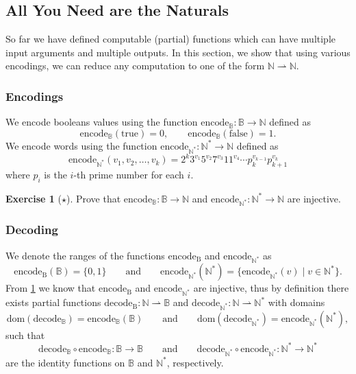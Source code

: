 \documentclass[11pt,a4paper,reqno]{amsart}
\theoremstyle{plain}
\theoremstyle{definition}
\theoremstyle{definition}
\newtheorem{exercise}[theorem]{Exercise}
\newcommand\exerciseLevelEasy{$\star$}
\begin{document}
\subsection{All You Need are the Naturals}\label{sec:only-natural}

So far we have defined computable (partial) functions which can have multiple input arguments and multiple outputs.
In this section, we show that using various encodings, we can reduce any computation to one of the form $\mathbb N \rightharpoonup \mathbb N$.

\subsubsection{Encodings}
We encode booleans values using the function $\mathrm{encode}_{\mathbb{B}}\colon \mathbb B \to \mathbb N$ defined as
\[
  \mathrm{encode}_{\mathbb B} (\mathrm{true}) = 0,
  \qquad
  \mathrm{encode}_{\mathbb B} (\mathrm{false}) = 1.
\]
We encode words using the function $\mathrm{encode}_{\mathbb N^*}\colon \mathbb N^* \to \mathbb N$ defined as
\[
  \mathrm{encode}_{\mathbb N^*}(v_1,v_2,\ldots ,v_k)
  =
  2^k 3^{v_1} 5^{v_2} 7^{v_3} 11^{v_4}\cdots p_{k}^{v_{k-1}} p_{k+1}^{v_k} 
\]
where $p_i$ is the $i$-th prime number for each $i$.

\begin{exercise}[\exerciseLevelEasy]\label{ex:prove-inj-of-encoding}
  Prove that $\mathrm{encode}_{\mathbb{B}}\colon \mathbb B \to \mathbb N$ and  $\mathrm{encode}_{\mathbb N^*}\colon \mathbb N^* \to \mathbb N$ are injective.
\end{exercise}

\subsubsection{Decoding}

We denote the ranges of the functions
$\mathrm{encode}_{\mathrm B}$ and
$\mathrm{encode}_{\mathbb N^*}$ as
\[
  \mathrm{encode}_{\mathrm B}(\mathbb B) = \{0,1\}
  \qquad
  \text{and}
  \qquad
  \mathrm{encode}_{\mathbb N^*}(\mathbb N^*) = \{
      \mathrm{encode}_{\mathbb N^*}(v)
      \mid
      v\in \mathbb N^*
  \}.
\]
From \cref{ex:prove-inj-of-encoding} we know that
$\mathrm{encode}_{\mathrm B}$ and
$\mathrm{encode}_{\mathbb N^*}$ are injective, thus by definition there exists partial functions
$\mathrm{decode}_{\mathrm B}\colon \mathbb N \rightharpoonup \mathbb B$ and
$\mathrm{decode}_{\mathbb N^*}\colon \mathbb N \rightharpoonup \mathbb N^*$ with domains
\[
  \mathrm{dom}(\mathrm{decode}_{\mathbb B}) = \mathrm{encode}_{\mathbb B}(\mathbb B)
  \qquad
  \text{and}
  \qquad
  \mathrm{dom}(\mathrm{decode}_{\mathbb N^*}) = \mathrm{encode}_{\mathbb N^*}(\mathbb N^*),
\]
such that 
\[
  \mathrm{decode}_{\mathbb B}\circ \mathrm{encode}_{\mathbb B}\colon \mathbb B \to \mathbb B
  \qquad\text{and}\qquad
  \mathrm{decode}_{\mathbb N^*}\circ \mathrm{encode}_{\mathbb N^*}\colon \mathbb N^* \to \mathbb N^*
\]
are the identity functions on $\mathbb B$ and $\mathbb N^*$, respectively.
\end{document}
